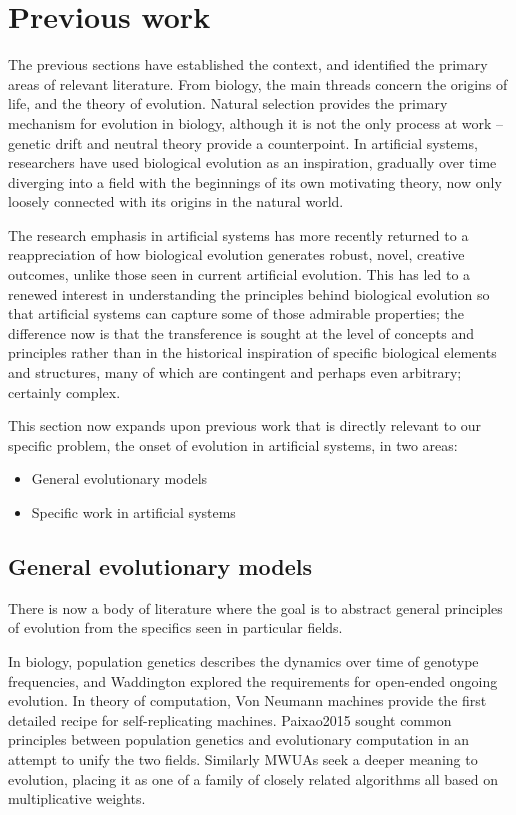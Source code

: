 \chapter{Previous work}

The previous sections have established the context, and identified the primary areas of relevant literature. From biology, the main threads concern the origins of life, and the theory of evolution. Natural selection provides the primary mechanism for evolution in biology, although it is not the only process at work -- genetic drift and neutral theory provide a counterpoint. In artificial systems, researchers have used biological evolution as an inspiration, gradually over time diverging into a field with the beginnings of its own motivating theory, now only loosely connected with its origins in the natural world.

The research emphasis in artificial systems has more recently returned to a reappreciation of how biological evolution generates robust, novel, creative outcomes, unlike those seen in current artificial evolution. This has led to a renewed interest in understanding the principles behind biological evolution so that artificial systems can capture some of those admirable properties; the difference now is that the transference is sought at the level of concepts and principles rather than in the historical inspiration of specific biological elements and structures, many of which are contingent and perhaps even arbitrary; certainly complex.

This section now expands upon previous work that is directly relevant to our specific problem, the onset of evolution in artificial systems, in two areas:

\begin{itemize}
	\item General evolutionary models
	\item Specific work in artificial systems
\end{itemize}

\section{General evolutionary models}

There is now a body of literature where the goal is to abstract general principles of evolution from the specifics seen in particular fields.

In biology, population genetics describes the dynamics over time of genotype frequencies, and Waddington explored the requirements for open-ended ongoing evolution.
In theory of computation, Von Neumann machines provide the first detailed recipe for self-replicating machines.
Paixao2015 sought common principles between population genetics and evolutionary computation in an attempt to unify the two fields. Similarly MWUAs seek a deeper meaning to evolution, placing it as one of a family of closely related algorithms all based on multiplicative weights.

